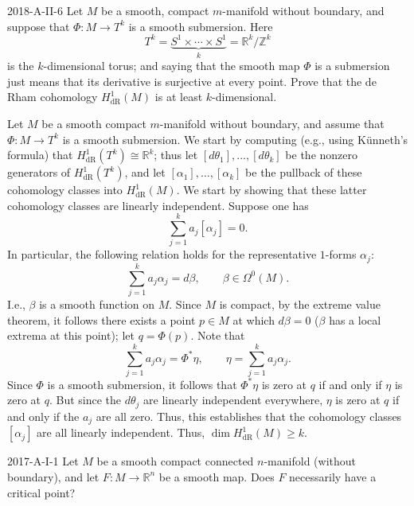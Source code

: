 \documentclass{article}
\begin{document}
	\begin{prb}{2018-A-II-6}
		Let $M$ be a smooth, compact $m$-manifold without boundary, and suppose that $\Phi: M \to T^{k}$ is a smooth submersion. Here 
		\begin{equation*}
			T^{k} = \underbrace{S^{1} \times \dotsm \times S^{1}}_{k} = \mathbb{R}^{k}/\mathbb{Z}^{k}
		\end{equation*}
		is the $k$-dimensional torus; and saying that the smooth map $\Phi$ is a submersion just means that its derivative is surjective at every point. Prove that the de Rham cohomology $H^{1}_{\text{dR}}(M)$ is at least $k$-dimensional. 
	\end{prb}
	Let $M$ be a smooth compact $m$-manifold without boundary, and assume that $\Phi: M \to T^{k}$ is a smooth submersion. We start by computing (e.g., using K\"unneth's formula) that $H^{1}_{\text{dR}}(T^{k}) \cong \mathbb{R}^{k}$; thus let $[d\theta_{1}], \ldots, [d\theta_{k}]$ be the nonzero generators of $H^1_{\text{dR}}(T^{k})$, and let $[\alpha_{1}], \ldots, [\alpha_{k}]$ be the pullback of these cohomology classes into $H^{1}_{\text{dR}}(M)$. We start by showing that these latter cohomology classes are linearly independent. Suppose one has 
	\begin{equation*}
		\sum_{j = 1}^{k}a_{j}[\alpha_{j}] = 0. 
	\end{equation*}
	In particular, the following relation holds for the representative $1$-forms $\alpha_{j}$: 
	\begin{equation*}
		\sum_{j = 1}^{k}a_{j}\alpha_{j} = d\beta, \qquad \beta \in \Omega^{0}(M). 
	\end{equation*}
	I.e., $\beta$ is a smooth function on $M$. Since $M$ is compact, by the extreme value theorem, it follows there exists a point $p \in M$ at which $d\beta = 0$ ($\beta$ has a local extrema at this point); let $q = \Phi(p)$. Note that 
	\begin{equation*}
		\sum_{j = 1}^{k}a_{j}\alpha_{j} = \Phi^{\ast}\eta, \qquad \eta = \sum_{j = 1}^{k}a_{j}\alpha_{j}. 
	\end{equation*}
	Since $\Phi$ is a smooth submersion, it follows that $\Phi^{\ast}\eta$ is zero at $q$ if and only if $\eta$ is zero at $q$. But since the $d\theta_{j}$ are linearly independent everywhere, $\eta$ is zero at $q$ if and only if the $a_{j}$ are all zero. Thus, this establishes that the cohomology classes $[\alpha_{j}]$ are all linearly independent. Thus, $\dim{H^{1}_{\text{dR}}(M)} \geq k$. 
	
	\begin{prb}{2017-A-I-1}
		Let $M$ be a smooth compact connected $n$-manifold (without boundary), and let $F: M \to \mathbb{R}^{n}$ be a smooth map. Does $F$ necessarily have a critical point? 
	\end{prb}
	
\end{document}
